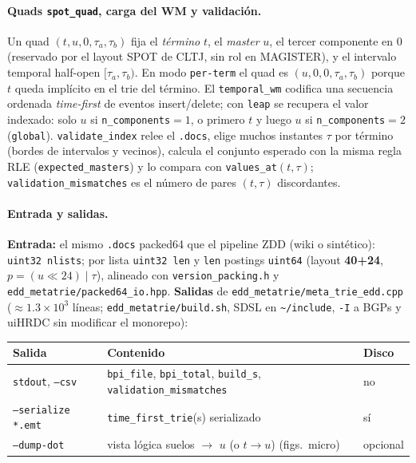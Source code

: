 \paragraph{Quads \texttt{spot\_quad}, carga del WM y validación.}
Un quad $(t,u,0,\tau_a,\tau_b)$ fija el \emph{término} $t$, el \emph{master} $u$,
el tercer componente en $0$ (reservado por el layout SPOT de CLTJ, sin rol en MAGISTER),
y el intervalo temporal half-open $[\tau_a,\tau_b)$.
En modo \texttt{per-term} el quad es $(u,0,0,\tau_a,\tau_b)$ porque $t$ queda implícito
en el trie del término.
El \texttt{temporal\_wm} codifica una secuencia ordenada \emph{time-first} de eventos
insert/delete; con \texttt{leap} se recupera el valor indexado: solo $u$ si
\texttt{n\_components}$=1$, o primero $t$ y luego $u$ si
\texttt{n\_components}$=2$ (\texttt{global}).
\texttt{validate\_index} relee el \texttt{.docs}, elige muchos instantes $\tau$ por
término (bordes de intervalos y vecinos), calcula el conjunto esperado con la misma
regla RLE (\texttt{expected\_masters}) y lo compara con \texttt{values\_at}$(t,\tau)$;
\texttt{validation\_mismatches} es el número de pares $(t,\tau)$ discordantes.

\paragraph{Entrada y salidas.}
\textbf{Entrada:} el mismo \texttt{.docs} packed64 que el pipeline ZDD (wiki o sintético):
\texttt{uint32 nlists}; por lista \texttt{uint32 len} y \texttt{len} postings \texttt{uint64}
(layout \textbf{40+24}, $p=(u\ll 24)\mathrel{|}\tau$), alineado con
\texttt{version\_packing.h} y \texttt{edd\_metatrie/packed64\_io.hpp}.
\textbf{Salidas} de \texttt{edd\_metatrie/meta\_trie\_edd.cpp}
($\approx 1.3\times 10^3$ líneas; \texttt{edd\_metatrie/build.sh}, SDSL en
\texttt{\textasciitilde/include}, \texttt{-I} a BGPs y uiHRDC sin modificar el monorepo):
\begin{center}
\small
\begin{tabular}{@{}lll@{}}
\hline
Salida & Contenido & Disco \\
\hline
\texttt{stdout}, \texttt{--csv} &
  \texttt{bpi\_file}, \texttt{bpi\_total}, \texttt{build\_s},
  \texttt{validation\_mismatches} &
  no \\
\texttt{--serialize *.emt} &
  \texttt{time\_first\_trie}(s) serializado &
  sí \\
\texttt{--dump-dot} &
  vista lógica suelos $\to$ $u$ (o $t\to u$) (figs.\ micro) &
  opcional \\
\hline
\end{tabular}
\end{center}

